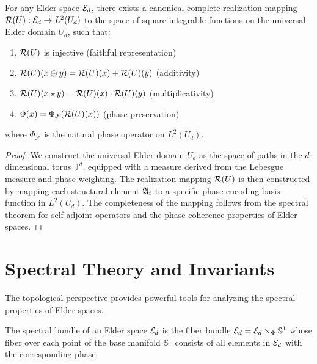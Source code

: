 \begin{theorem}
For any Elder space $\mathcal{E}_{d}$, there exists a canonical complete realization mapping $\mathcal{R}(U): \mathcal{E}_{d} \rightarrow L^2(U_d)$ to the space of square-integrable functions on the universal Elder domain $U_d$, such that:
\begin{enumerate}
    \item $\mathcal{R}(U)$ is injective (faithful representation)
    \item $\mathcal{R}(U)(x \oplus y) = \mathcal{R}(U)(x) + \mathcal{R}(U)(y)$ (additivity)
    \item $\mathcal{R}(U)(x \star y) = \mathcal{R}(U)(x) \cdot \mathcal{R}(U)(y)$ (multiplicativity)
    \item $\Phi(x) = \Phi_{\mathcal{F}}(\mathcal{R}(U)(x))$ (phase preservation)
\end{enumerate}
where $\Phi_{\mathcal{F}}$ is the natural phase operator on $L^2(U_d)$.
\end{theorem}

\begin{proof}
We construct the universal Elder domain $U_d$ as the space of paths in the $d$-dimensional torus $\mathbb{T}^d$, equipped with a measure derived from the Lebesgue measure and phase weighting. The realization mapping $\mathcal{R}(U)$ is then constructed by mapping each structural element $\mathfrak{A}_{i}$ to a specific phase-encoding basis function in $L^2(U_d)$. The completeness of the mapping follows from the spectral theorem for self-adjoint operators and the phase-coherence properties of Elder spaces.
\end{proof}

\section{Spectral Theory and Invariants}

The topological perspective provides powerful tools for analyzing the spectral properties of Elder spaces.

\begin{definition}
The spectral bundle of an Elder space $\mathcal{E}_{d}$ is the fiber bundle $\mathcal{E}_d = \mathcal{E}_{d} \times_{\Phi} \mathbb{S}^1$ whose fiber over each point of the base manifold $\mathbb{S}^1$ consists of all elements in $\mathcal{E}_{d}$ with the corresponding phase.
\end{definition}

